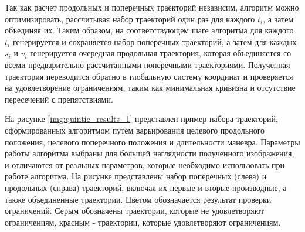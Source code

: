 Так как расчет продольных и поперечных траекторий независим, алгоритм можно оптимизировать, рассчитывая набор траекторий
один раз для каждого $t_i$, а затем объединяя их. Таким образом, на соответствующем шаге алгоритма для каждого $t_i$
генерируется и сохраняется набор поперечных траекторий, а затем для каждых $s_i$ и $v_i$ генерируется очередная
продольная траектория, которая объединяется со всеми предварительно рассчитанными поперечными траекториями.
Полученная траектория переводится обратно в глобальную систему координат и проверяется на удовлетворение ограничениям,
таким как минимальная кривизна и отсутствие пересечений с препятствиями.



На рисунке \ref{img:quintic_results_1} представлен пример набора траекторий, сформированных алгоритмом путем варьирования
целевого продольного положения, целевого поперечного положения и длительности маневра. Параметры работы алгоритма выбраны
для большей наглядности полученного изображения, и отличаются от реальных параметров, которые необходимо использовать
при работе алгоритма. На рисунке представлены набор поперечных (слева) и продольных (справа) траекторий, включая их
первые и вторые производные, а также объединенные траектории. Цветом обозначается результат проверки ограничений.
Серым обозначены траектории, которые не удовлетворяют ограничениям, красным - траектории, которые удовлетворяют
ограничениям.


